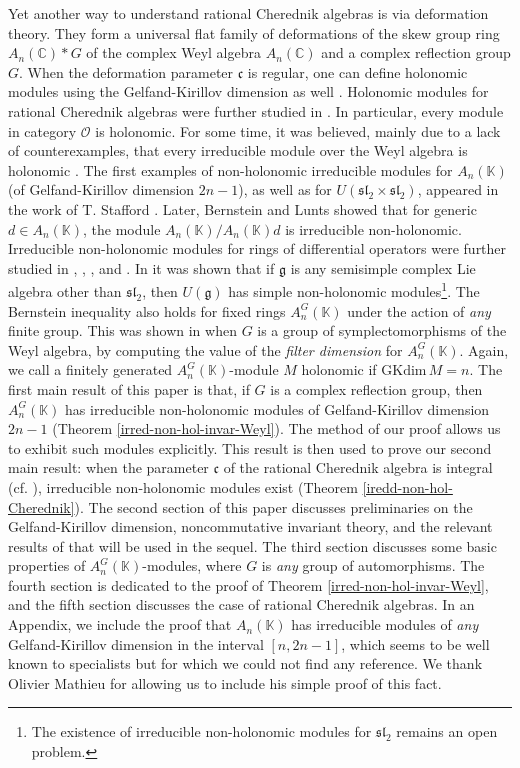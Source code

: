 \documentclass[12pt, a4paper]{amsart}
\newcommand{\Weyl}{A_n(\mathbb{K})} %
\newcommand{\Invar}{A_n^G(\mathbb{K})}           %
\newcommand{\GKdim}{\text{GKdim}}    %
\def\C{\mathbb C}
\def\g{\mathfrak g}
\def\c{\mathfrak c}
\begin{document}
Yet another way to understand rational Cherednik algebras is via deformation theory. They form a universal flat family of deformations of the skew group ring $A_n(\C)*G$ of the complex Weyl algebra $A_n(\C)$ and a complex reflection group $G$. When the deformation parameter $\mathfrak{c}$ is regular, one can define holonomic modules using the Gelfand-Kirillov dimension as well \cite[Proposition 3.4]{Thompson}. Holonomic modules for rational Cherednik algebras were further studied in \cite{Bellamy}. In particular, every module in category $\mathcal{O}$ \cite{GGOR} is holonomic.
For some time, it was believed, mainly due to a lack of counterexamples, that every irreducible module over the Weyl algebra is holonomic \cite[Problem 1, Chapter 1, \S~9]{Bjork}. The first examples of non-holonomic irreducible modules for $\Weyl$ (of Gelfand-Kirillov dimension $2n-1$), as well as for $U(\mathfrak{sl}_2 \times \mathfrak{sl}_2)$, appeared in the work of T. Stafford \cite{Stafford}. Later, Bernstein and Lunts \cite{BerL, Lunts} showed that for generic $d \in \Weyl$, the module $\Weyl/\Weyl d$ is irreducible non-holonomic. Irreducible non-holonomic modules for rings of differential operators were further studied in \cite{Coutinho0}, \cite{Coutinho03}, \cite{Coutinho06}, and \cite{Coutinho07}. In \cite{Coutinho17} it was shown that if $\mathfrak{g}$ is any semisimple complex Lie algebra other than $\mathfrak{sl}_2$, then $U(\g)$ has simple non-holonomic modules\footnote{The existence of irreducible non-holonomic modules for $\mathfrak{sl}_2$ remains an open problem.}.
The Bernstein inequality also holds for fixed rings $\Invar$ under the action of \textit{any} finite group. This was shown in \cite{FS4} when $G$ is a group of symplectomorphisms of the Weyl algebra, by computing the value of the \textit{filter dimension} \cite{Bavula2} for $\Invar$. Again, we call a finitely generated $\Invar$-module $M$ holonomic if $\GKdim \, M= n$.
The first main result of this paper is that, if $G$ is a complex reflection group, then $\Invar$ has irreducible non-holonomic modules of Gelfand-Kirillov dimension $2n-1$ (Theorem \ref{irred-non-hol-invar-Weyl}). The method of our proof allows us to exhibit such modules explicitly. This result is then used to prove our second main result: when the parameter $\c$ of the rational Cherednik algebra is integral (cf. \cite{Berest}), irreducible non-holonomic modules exist (Theorem \ref{iredd-non-hol-Cherednik}).
The second section of this paper discusses preliminaries on the Gelfand-Kirillov dimension, noncommutative invariant theory, and the relevant results of \cite{Coutinho0} that will be used in the sequel.
The third section discusses some basic properties of $\Invar$-modules, where $G$ is \textit{any} group of automorphisms. The fourth section is dedicated to the proof of Theorem \ref{irred-non-hol-invar-Weyl}, and the fifth section discusses the case of rational Cherednik algebras.
In an Appendix, we include the proof that $\Weyl$ has irreducible modules of \textit{any} Gelfand-Kirillov dimension in the interval $[n,2n-1]$, which seems to be well known to specialists but for which we could not find any reference. We thank Olivier Mathieu for allowing us to include his simple proof of this fact.
\end{document}
